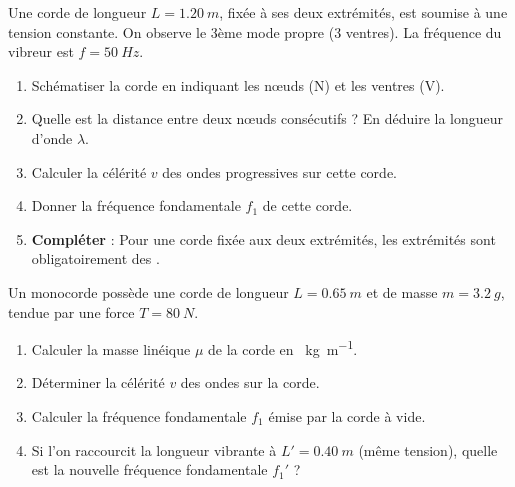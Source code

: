 \documentclass[11pt]{article}
\begin{document}
\begin{exercice}
Une corde de longueur $L = \SI{1,20}{m}$, fixée à ses deux extrémités, est soumise à une tension constante. On observe le 3ème mode propre (3 ventres). La fréquence du vibreur est $f = \SI{50}{Hz}$.
\begin{enumerate}
    \item Schématiser la corde en indiquant les nœuds (N) et les ventres (V).
    \item Quelle est la distance entre deux nœuds consécutifs ? En déduire la longueur d'onde $\lambda$.
    \item Calculer la célérité $v$ des ondes progressives sur cette corde.
    \item Donner la fréquence fondamentale $f_1$ de cette corde.
    \item \textbf{Compléter} : Pour une corde fixée aux deux extrémités, les extrémités sont obligatoirement des \underline{\hspace{3cm}}.
\end{enumerate}
\end{exercice}

\begin{exercice}
Un monocorde possède une corde de longueur $L = \SI{0,65}{m}$ et de masse $m = \SI{3,2}{g}$, tendue par une force $T = \SI{80}{N}$.
\begin{enumerate}
    \item Calculer la masse linéique $\mu$ de la corde en \SI{}{kg.m^{-1}}.
    \item Déterminer la célérité $v$ des ondes sur la corde.
    \item Calculer la fréquence fondamentale $f_1$ émise par la corde à vide.
    \item Si l'on raccourcit la longueur vibrante à $L' = \SI{0,40}{m}$ (même tension), quelle est la nouvelle fréquence fondamentale $f_1'$ ?
\end{enumerate}
\end{exercice}
\end{document}
